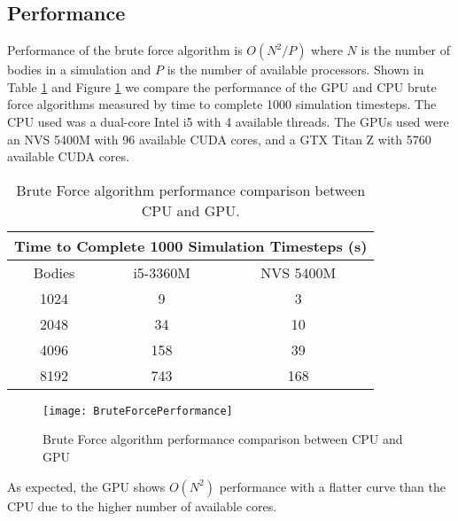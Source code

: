 \documentclass{thesis}
\begin{document}
\subsection{Performance}
Performance of the brute force algorithm is $O\left(N^2/P\right)$ where $N$ is the number of bodies in a simulation and $P$ is the number of available processors. Shown in Table \ref{tab:BruteForcePerformance} and Figure \ref{fig:BruteForcePerformance} we compare the performance of the GPU and CPU brute force algorithms measured by time to complete 1000 simulation timesteps. The CPU used was a dual-core Intel i5 with 4 available threads. The GPUs used were an NVS 5400M with 96 available CUDA cores, and a GTX Titan Z with 5760 available CUDA cores.
\begin{table}
    \centering
    \caption{Brute Force algorithm performance comparison between CPU and GPU.}
    \label{tab:BruteForcePerformance}
    \begin{tabular}{|c|||c||c|}
        \hline
        \multicolumn{3}{|c|}{Time to Complete 1000 Simulation Timesteps (s)}\\
        \hline
        Bodies & i5-3360M & NVS 5400M \\
        \hline
        1024 & 9 & 3\\
        2048 & 34 & 10\\
        4096 & 158 & 39\\
        8192 & 743 & 168\\
        \hline
    \end{tabular}
\end{table}
\begin{figure}[t]
    \caption{Brute Force algorithm performance comparison between CPU and GPU}
    \label{fig:BruteForcePerformance}
    \centering
    \texttt{[image: BruteForcePerformance]}
\end{figure}
As expected, the GPU shows $O(N^2)$ performance with a flatter curve than the CPU due to the higher number of available cores.
\end{document}
